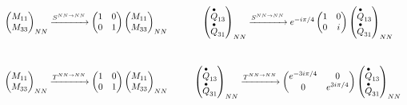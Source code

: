 \documentclass[12pt,a4paper]{article}
\newcounter{arrow}
\begin{document}
\begin{align}
\xymatrix{
{\left( \begin{matrix}
M_{11}\\
M_{33}\\
\end{matrix} \right)_{NN}
\xrightarrow{S^{NN \rightarrow NN}}
 \left( \begin{matrix}
1&0\\
0&1\\
\end{matrix} \right)
\left( \begin{matrix}
M_{11}\\
M_{33}\\
\end{matrix} \right)_{NN}}
&
{
\left( \begin{matrix}
\stackrel{\bullet}{Q}_{13}\\
\stackrel{\bullet}{Q}_{31}\\
\end{matrix} \right)_{NN}
\xrightarrow{S^{NN \rightarrow NN}}
e^{- i \pi /4}\left( \begin{matrix}
1&0\\
0&i\\
\end{matrix} \right)
\left( \begin{matrix}
\stackrel{\bullet}{Q}_{13}\\
\stackrel{\bullet}{Q}_{31}\\
\end{matrix} \right)_{NN} 
}
\\
{
\left( \begin{matrix}
M_{11}\\
M_{33}\\
\end{matrix} \right)_{NN}
\xrightarrow{T^{NN \rightarrow NN}}
 \left( \begin{matrix}
1&0\\
0&1\\
\end{matrix} \right)
\left( \begin{matrix}
M_{11}\\
M_{33}\\
\end{matrix} \right)_{NN}
} & 
{
\left( \begin{matrix}
\stackrel{\bullet}{Q}_{13}\\
\stackrel{\bullet}{Q}_{31}\\
\end{matrix} \right)_{NN}
\xrightarrow{T^{NN \rightarrow NN}}
\left( \begin{matrix}
e^{-3i \pi /4}&0\\
0&e^{3 i \pi /4}\\
\end{matrix} \right)
\left( \begin{matrix}
\stackrel{\bullet}{Q}_{13}\\
\stackrel{\bullet}{Q}_{31}\\
\end{matrix} \right)_{NN}
}
} 
\end{align}
\end{document}
